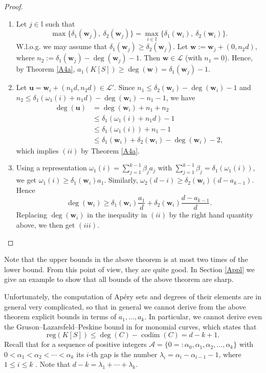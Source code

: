 \documentclass[11pt]{article}
\def\deg{\operatorname{deg}}
\def\codim{\operatorname{codim}}
\def\reg{\mathrm{reg}}
\def\ubf{{\mathbf u}}
\def\wbf{{\mathbf w}}
\def\Lcal{{\mathcal L}}
\def\Acal{{\mathcal A}}
\def\Iset{{\mathbb I}}
\theoremstyle{remark}
\theoremstyle{definition}
\begin{document}
\begin{proof} 
\begin{enumerate}[\((i)\)]
    \item Let $j\in \Iset$ such that
$$\max
\{\delta_1(\wbf_j),\ \delta_2(\wbf_j)\} = \max_{i\in \Iset}
\{\delta_1(\wbf_i),\ \delta_2(\wbf_i)\}.$$
W.l.o.g. we may assume that $\delta_1(\wbf_j)\geq  \delta_2(\wbf_j)$. Let $\wbf := \wbf_j + (0, n_2d)$, where $n_2 :=  \delta_1(\wbf_j) - \deg(\wbf_j) - 1$. Then $\wbf \in \Lcal$ (with $n_1 = 0$). Hence, by Theorem \ref{A4a}, $a_1(K[S]) \geq \deg(\wbf) =  \delta_1(\wbf_j) - 1$.
\item Let $\ubf =  \wbf_i + (n_1d, n_2d) \in \Lcal'$. Since
$n_1 \le \delta_2(\wbf_i) - \deg(\wbf_i) - 1$ and $ n_2 \le \delta_1(\omega_1(i) + n_1d) - \deg(\wbf_i) - n_1 -1$, we have
\begin{align*}
    \deg(\ubf) & = \deg(\wbf_i) + n_1 + n_2\\
&\leq \delta_1(\omega_1(i) + n_1d) - 1\\
&\leq  \delta_1(\omega_1(i))  + n_1 - 1\\
&\leq  \delta_1(\wbf_i)  + \delta_2 (\wbf_i) - \deg(\wbf_i) - 2,
\end{align*}
 which implies \((ii)\) by Theorem \ref{A4a}.
 \item Using a representation $\omega_1(i) = \sum_{j=1}^{k-1} \beta_j a_j$ with $\sum_{j=1}^{k-1} \beta_j = \delta_1(\omega_1(i))$, we get
 $\omega_1(i) \geq  \delta_1(\wbf_i) a_1$. Similarly, $\omega_2(d-i) \geq \delta_2(\wbf_i)  (d-a_{k-1})$. Hence
 $$\deg(\wbf_i) \geq  \delta_1(\wbf_i) \frac{a_1}{d} + \delta_2(\wbf_i) \frac{ d-a_{k-1}}{d}.$$
 Replacing $\deg(\wbf_i)$ in the inequality in \((ii)\) by the right hand quantity above, we then get \((iii)\).
\end{enumerate}
\end{proof}

Note that the upper bounds in the above theorem is at most two times of the lower bound. From this point of view, they are quite good. In Section \ref{Appl} we give an example to show that all bounds of the above theorem are sharp.  

Unfortunately, the computation of Ap\'ery sets and degrees of their elements are in general very complicated, so that in general we cannot derive from the above theorem explicit bounds in terms of $a_1,\ldots,a_k$.  In particular, we cannot derive even the Gruson--Lazarsfeld--Peskine bound in \cite{GLP} for monomial curves, which states that
$$\reg(K[S]) \leq \deg(C) - \codim(C) = d- k+1.$$
Recall that for a sequence of positive integers $\Acal= \{0 =: \alpha_0, \alpha_1, \alpha_2, \ldots , \alpha_k\}$ with $0 < \alpha_1 < \alpha_2 < \cdots < \alpha_k$ its $i$-th gap is the number $\lambda_i = \alpha_i - \alpha_{i-1} - 1$, where $1\leq i\leq k$ . Note that $d-k = \lambda_1 + \cdots + \lambda_k$.
\end{document}

